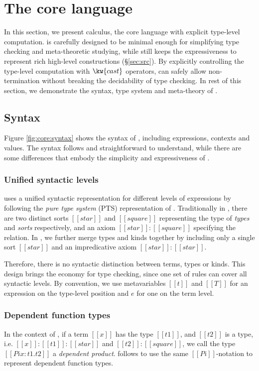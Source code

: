 \section{The core language}\label{sec:core}

In this section, we present \name calculus, the core language with explicit type-level computation. \name is carefully designed to be minimal enough for simplifying type checking and meta-theoretic studying, while still keeps the expressiveness to represent rich high-level constructions (\S \ref{sec:src}). By explicitly controlling the type-level computation with $\kw{cast}$ operators, \name can safely allow non-termination without breaking the decidability of type checking. In rest of this section, we demonstrate the syntax, type system and meta-theory of \name.

\subsection{Syntax}\label{sec:core:syn}
Figure \ref{fig:core:syntax} shows the syntax of \name, including expressions, contexts and values. The syntax follows \cc and straightforward to understand, while there are some differences that embody the simplicity and expressiveness of \name.

\subsubsection{Unified syntactic levels}
\name uses a unified syntactic representation for different levels of expressions by following the \emph{pure type system} (PTS) representation of \cc. Traditionally in \cc, there are two distinct sorts $[[star]]$ and $[[square]]$ representing the type of \emph{types} and \emph{sorts} respectively, and an axiom $[[star]]:[[square]]$ specifying the relation. In \name, we further merge types and kinds together by including only a single sort $[[star]]$ and an impredicative axiom $[[star]]:[[star]]$. 

Therefore, there is no syntactic distinction between terms, types or kinds. This design brings the economy for type checking, since one set of rules can cover all syntactic levels. By convention, we use metavariables $[[t]]$ and $[[T]]$ for an expression on the type-level position and $e$ for one on the term level.

\subsubsection{Dependent function types}
In the context of \cc, if a term $[[x]]$ has the type $[[t1]]$, and $[[t2]]$ is a type, i.e. $[[x]]:[[t1]]:[[star]]$ and $[[t2]]:[[square]]$, we call the type $[[Pi x:t1.t2]]$ a \emph{dependent product}. \name follows \cc to use the same $[[Pi]]$-notation to represent dependent function types.


